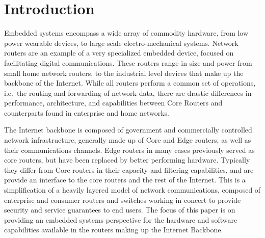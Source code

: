 \section{Introduction}

Embedded systems encompass a wide array of commodity hardware, from low power
wearable devices, to large scale electro-mechanical systems. Network routers
are an example of a very specialized embedded device, focused on facilitating
digital communications. These routers range in size and power from small home
network routers, to the industrial level devices that make up the backbone of
the Internet. While all routers perform a common set of operations, i.e.\ the
routing and forwarding of network data, there are drastic differences in
performance, architecture, and capabilities between Core Routers and
counterparts found in enterprise and home networks.

The Internet backbone is composed of government and commercially controlled
network infrastructure, generally made up of Core and Edge routers, as well as
their communications channels. Edge routers in many cases previously served as
core routers, but have been replaced by better performing hardware. Typically
they differ from Core routers in their capacity and filtering capabilities, and
are provide an interface to the core routers and the rest of the Internet. This
is a simplification of a heavily layered model of network communications,
composed of enterprise and consumer routers and switches working in concert to
provide security and service guarantees to end users. The focus of this paper
is on providing an embedded systems perspective for  the hardware and software
capabilities available in the routers making up the Internet Backbone.



